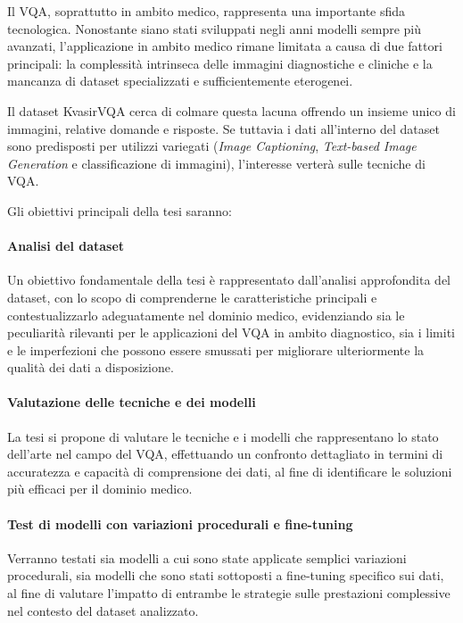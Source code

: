 \documentclass[../main.tex]{subfiles}
\begin{document}
Il VQA, soprattutto in ambito medico, rappresenta una importante sfida tecnologica. Nonostante siano stati sviluppati negli anni modelli sempre più avanzati, l'applicazione in ambito medico rimane limitata a causa di due fattori principali: la complessità intrinseca delle immagini diagnostiche e cliniche e la mancanza di dataset specializzati e sufficientemente eterogenei.
 
Il dataset KvasirVQA\cite{gautam2024kvasirvqa} cerca di colmare questa lacuna offrendo un insieme unico di immagini, relative domande e risposte. 
Se tuttavia i dati all'interno del dataset sono predisposti per utilizzi variegati (\textit{Image Captioning}, \textit{Text-based Image Generation} e classificazione di immagini), l'interesse verterà sulle tecniche di VQA. 

Gli obiettivi principali della tesi saranno:

\paragraph{Analisi del dataset} 
Un obiettivo fondamentale della tesi è rappresentato dall'analisi approfondita del dataset, con lo scopo di comprenderne le caratteristiche principali e contestualizzarlo adeguatamente nel dominio medico, evidenziando sia le peculiarità rilevanti per le applicazioni del VQA in ambito diagnostico, sia i limiti e le imperfezioni che possono essere smussati per migliorare ulteriormente la qualità dei dati a disposizione.

\paragraph{Valutazione delle tecniche e dei modelli} 
La tesi si propone di valutare le tecniche e i modelli che rappresentano lo stato dell'arte nel campo del VQA, effettuando un confronto dettagliato in termini di accuratezza e capacità di comprensione dei dati, al fine di identificare le soluzioni più efficaci per il dominio medico.

\paragraph{Test di modelli con variazioni procedurali e fine-tuning}  
Verranno testati sia modelli a cui sono state applicate semplici variazioni procedurali, sia modelli che sono stati sottoposti a fine-tuning specifico sui dati, al fine di valutare l'impatto di entrambe le strategie sulle prestazioni complessive nel contesto del dataset analizzato.
\end{document}
